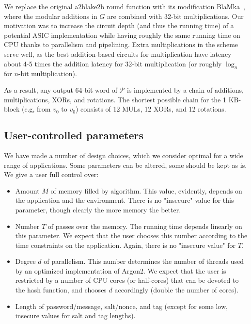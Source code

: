 \documentclass[a4paper]{article}
\begin{document}
We replace the original a2blake2b round function 
with its modification BlaMka~\cite{cryptoeprint:2015:136}, where the modular additions in $G$ are combined with 32-bit multiplications. Our motivation was to increase the circuit depth (and thus the running time) of a potential ASIC implementation while having roughly the same running time on CPU thanks to parallelism and pipelining. Extra multiplications in the scheme serve well, as the best addition-based circuits for multiplication have latency about 4-5 times the addition latency for 32-bit multiplication (or roughly $\log_n$ for $n$-bit multiplication).

As a result, any output 64-bit word of  $\mathcal{P}$  is implemented by a chain of additions, multiplications, XORs, and rotations. The shortest possible chain for the 1 KB-block (e.g, from $v_0$  to $v_0$) consists of 12 MULs, 12 XORs, and 12 rotations.



\subsection{User-controlled parameters}

We have made a number of design choices, which we consider optimal for a wide range of applications. Some parameters can be altered, some should be kept as is. We give a user full control over:
\begin{itemize}
  \item Amount $M$ of memory filled by algorithm. This value, evidently, depends on the application and the environment. There is no "insecure" value for this parameter, though clearly the more memory the better.
  \item Number $T$ of passes over the memory. The running  time depends linearly on this parameter. We expect that the user chooses this number according to the time constraints on the application. Again, there is no "insecure value" for $T$.
  \item Degree $d$ of parallelism. This number determines the number of threads used by an optimized implementation of \textsf{Argon2}. We expect that the user is restricted by a number of CPU cores (or half-cores) that can be devoted to the hash function, and chooses $d$ accordingly (double the number of cores).
  \item Length of password/message, salt/nonce, and tag (except for some low, insecure values for salt and tag lengths).
\end{itemize}
\end{document}
